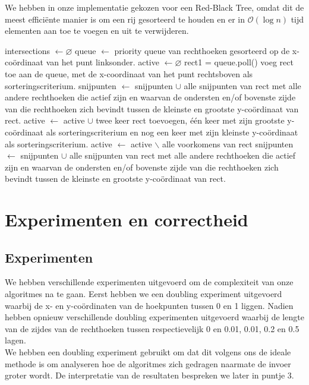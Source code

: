 \documentclass[11pt,a4paper,titlepage]{article}
\begin{document}
	We hebben in onze implementatie gekozen voor een Red-Black Tree, omdat dit de meest efficiënte manier is om een rij gesorteerd te houden en er in  $\mathcal{O}(\log n)$ tijd elementen aan toe te voegen en uit te verwijderen.	
		\begin{algorithm}[H]
			\caption{}
			\begin{algorithmic}[1]
				\State intersections $\gets \varnothing $
				\State queue $\gets$ priority queue van rechthoeken gesorteerd op de x-coördinaat van het punt linksonder.
				\State active $\gets \varnothing$
				\State rect1 = queue.poll()
				\State voeg rect toe aan de queue, met de x-coordinaat van het punt rechtsboven als sorteringscriterium.
				\State snijpunten $\gets$ snijpunten $\cup$ alle snijpunten van rect met alle andere rechthoeken die actief zijn en waarvan de ondersten en/of bovenste zijde van die rechthoeken zich bevindt tussen de kleinste en grootste y-coördinaat van rect.
				\State active $\gets$ active $\cup$ twee keer rect toevoegen, één keer met zijn grootste y-coördinaat als sorteringscriterium en nog een keer met zijn kleinste y-coördinaat als sorteringscriterium.
				\Else
				\State active $\gets$ active $\backslash$ alle voorkomens van rect
				\State snijpunten $\gets$ snijpunten $\cup$ alle snijpunten van rect met alle andere rechthoeken die actief zijn en waarvan de ondersten en/of bovenste zijde van die rechthoeken zich bevindt tussen de kleinste en grootste y-coördinaat van rect.
				\EndIf
				\EndWhile
			\end{algorithmic}
		\end{algorithm}
	
	\section{Experimenten en correctheid}
		\subsection{Experimenten}
		We hebben verschillende experimenten uitgevoerd om de complexiteit van onze algoritmes na te gaan. Eerst hebben we een doubling experiment uitgevoerd waarbij de x- en y-coördinaten van de hoekpunten tussen 0 en 1 liggen.  Nadien hebben opnieuw verschillende doubling experimenten uitgevoerd waarbij de lengte van de zijdes van de rechthoeken tussen  respectievelijk 0 en 0.01, 0.01, 0.2 en 0.5 lagen.\\ We hebben een doubling experiment gebruikt om dat dit volgens ons de ideale methode is om analyseren hoe de algoritmes zich gedragen naarmate de invoer groter wordt. De interpretatie van de resultaten bespreken we later in puntje 3.
\end{document}
